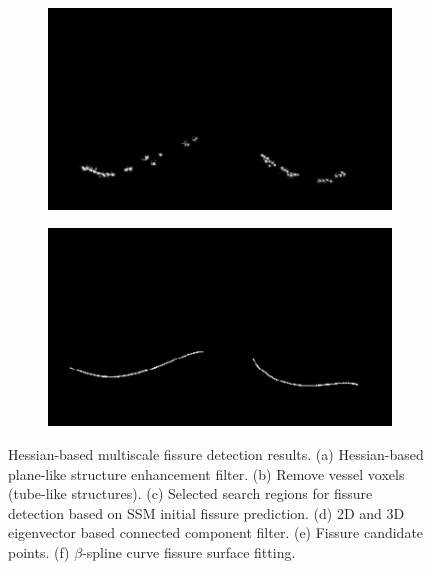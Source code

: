 {\begin{figure}[htbp]
\begin{subfigure}{.41\linewidth}
  \includegraphics[width=\linewidth,trim={{.0\wd0} {.0\wd0} {.0\wd0} {.0\wd0}},clip]{Segmentation/Image/FissureDetection5.jpg}
  \caption{}
	\label{fig:FissureDetection-e}
\end{subfigure}
\begin{subfigure}{.415\linewidth}%
  \includegraphics[width=\linewidth,trim={{.0\wd0} {.0\wd0} {.0\wd0} {.0\wd0}},clip]{Segmentation/Image/FissureDetection6.jpg}
  \caption{}
	\label{fig:FissureDetection-f}
\end{subfigure}
\caption{Hessian-based multiscale fissure detection results. (a) Hessian-based plane-like structure enhancement filter. (b) Remove vessel voxels (tube-like structures). (c) Selected search regions for fissure detection based on SSM initial fissure prediction. (d) 2D and 3D eigenvector based connected component filter. (e) Fissure candidate points. (f) $\beta$-spline curve fissure surface fitting.}
\label{fig:FissureDetection}
\end{figure}

}
